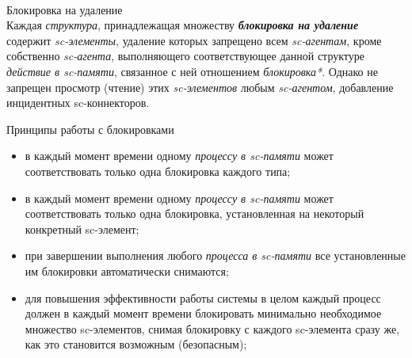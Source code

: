 \begin{frame}{\\Блокировка на удаление}
\topline
\vspace{15pt}
 \\

  Каждая \textit{структура}, принадлежащая множеству \textbf{\textit{блокировка на удаление}} содержит \textit{sc-элементы}, удаление которых запрещено всем \textit{sc-агентам}, кроме собственно \textit{sc-агента}, выполняющего соответствующее данной структуре \textit{действие в sc-памяти}, связанное с ней отношением \textit{блокировка*}. Однако не запрещен просмотр (чтение) этих \textit{sc-элементов} любым \textit{sc-агентом}, добавление инцидентных sc-коннекторов.  
\end{frame}
    
    
\begin{frame}{Принципы работы с блокировками}
\topline
\vspace{30pt}
 \\

\begin{itemize}
	\item в каждый момент времени одному \textit{процессу в sc-памяти} может соответствовать только одна блокировка каждого типа;
	\item в каждый момент времени одному \textit{процессу в sc-памяти} может соответствовать только одна блокировка, установленная на некоторый конкретный sc-элемент;
	\item при завершении выполнения любого \textit{процесса в sc-памяти} все установленные им блокировки автоматически снимаются;
	\item для повышения эффективности работы системы в целом каждый процесс должен в каждый момент времени блокировать минимально необходимое множество sc-элементов, снимая блокировку с каждого sc-элемента сразу же, как это становится возможным (безопасным);    
    \end{itemize}
    \end{frame}

